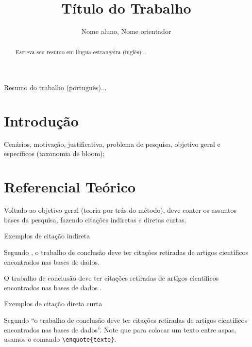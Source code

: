 \documentclass[12pt]{article}
\title{Título do Trabalho} %
\author{Nome aluno\inst{1}, Nome orientador\inst{1}} %
\begin{document}
\maketitle %

\begin{abstract} %
  Escreva seu resumo em língua estrangeira (inglês)...
\end{abstract}
     
\begin{resumo}
  Resumo do trabalho (português)...  
\end{resumo}

\section{Introdução}
Cenários, motivação, justificativa, problema de pesquisa, objetivo geral e específicos (taxonomia de bloom);

\section{Referencial Teórico}
Voltado ao objetivo geral (teoria por trás do método), deve conter os assuntos bases da pesquisa, fazendo citações indiretas e diretas curtas.

\begin{description}
    \item[Exemplos de citação indireta]    
\end{description}

Segundo \textcite{spinello2024}, o trabalho de conclusão deve ter citações retiradas de artigos científicos encontrados nas bases de dados. 

O trabalho de conclusão deve ter citações retiradas de artigos científicos encontrados nas bases de dados \cite{spinello2024}.

\begin{description}
    \item[Exemplos de citação direta curta]
\end{description}

Segundo \textcite{spinello2024} \enquote{o trabalho de conclusão deve ter citações retiradas de artigos científicos encontrados nas bases de dados}. Note que para colocar um texto entre aspas, usamos o comando \verb|\enquote{texto}|.
\end{document}
